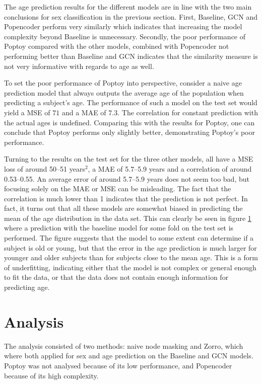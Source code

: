The age prediction results for the different models are in line with the two main conclusions for sex classification in the previous section. First, Baseline, GCN and Popencoder perform very similarly which indicates that increasing the model complexity beyond Baseline is unnecessary. Secondly, the poor performance of Poptoy compared with the other models, combined with Popencoder not performing better than Baseline and GCN indicates that the similarity measure is not very informative with regards to age as well. 

To set the poor performance of Poptoy into perspective, consider a naive age prediction model that always outputs the average age of the population when predicting a subject's age. The performance of such a model on the test set would yield a MSE of $71$ and a MAE of $7.3$. The correlation for constant prediction with the actual ages is undefined. Comparing this with the results for Poptoy, one can conclude that Poptoy performs only slightly better, demonstrating Poptoy's poor performance.

Turning to the results on the test set for the three other models, all have a MSE loss of around 50--51 years$^2$, a MAE of 5.7--5.9 years and a correlation of around 0.53--0.55. An average error of around 5.7--5.9 years does not seem too bad, but focusing solely on the MAE or MSE can be misleading. The fact that the correlation is much lower than 1 indicates that the prediction is not perfect. In fact, it turns out that all these models are somewhat biased in predicting the mean of the age distribution in the data set. This can clearly be seen in figure \ref{} where a prediction with the baseline model for some fold on the test set is performed. The figure suggests that the model to some extent can determine if a subject is old or young, but that the error in the age prediction is much larger for younger and older subjects than for subjects close to the mean age. This is a form of underfitting, indicating either that the model is not complex or general enough to fit the data, or that the data does not contain enough information for predicting age.

\section{Analysis}
The analysis consisted of two methods: naive node masking and Zorro, which where both applied for sex and age prediction on the Baseline and GCN models. Poptoy was not analysed because of its low performance, and Popencoder because of its high complexity.

